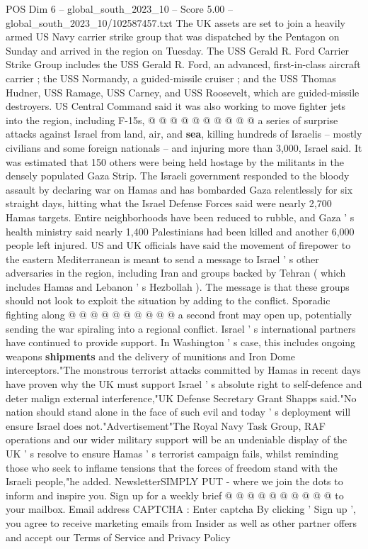 \begin{textsample}{POS Dim 6 – global\_south\_2023\_10 – Score 5.00 – global\_south\_2023\_10/102587457.txt}
The UK assets are set to join a heavily armed US Navy carrier strike group that was dispatched by the Pentagon on Sunday and arrived in the region on Tuesday.
The USS Gerald R.
Ford Carrier Strike Group includes the USS Gerald R.
Ford, an advanced, first-in-class aircraft carrier ; the USS Normandy, a guided-missile cruiser ; and the USS Thomas Hudner, USS Ramage, USS Carney, and USS Roosevelt, which are guided-missile destroyers.
US Central Command said it was also working to move fighter jets into the region, including F-15s, @ @ @ @ @ @ @ @ @ @ a series of surprise attacks against Israel from land, air, and \textbf{sea}, killing hundreds of Israelis -- mostly civilians and some foreign nationals -- and injuring more than 3,000, Israel said.
It was estimated that 150 others were being held hostage by the militants in the densely populated Gaza Strip.
The Israeli government responded to the bloody assault by declaring war on Hamas and has bombarded Gaza relentlessly for six straight days, hitting what the Israel Defense Forces said were nearly 2,700 Hamas targets.
Entire neighborhoods have been reduced to rubble, and Gaza ' s health ministry said nearly 1,400 Palestinians had been killed and another 6,000 people left injured.
US and UK officials have said the movement of firepower to the eastern Mediterranean is meant to send a message to Israel ' s other adversaries in the region, including Iran and groups backed by Tehran ( which includes Hamas and Lebanon ' s Hezbollah ).
The message is that these groups should not look to exploit the situation by adding to the conflict.
Sporadic fighting along @ @ @ @ @ @ @ @ @ @ a second front may open up, potentially sending the war spiraling into a regional conflict.
Israel ' s international partners have continued to provide support.
In Washington ' s case, this includes ongoing weapons \textbf{shipments} and the delivery of munitions and Iron Dome interceptors."The monstrous terrorist attacks committed by Hamas in recent days have proven why the UK must support Israel ' s absolute right to self-defence and deter malign external interference,"UK Defense Secretary Grant Shapps said."No nation should stand alone in the face of such evil and today ' s deployment will ensure Israel does not."Advertisement"The Royal Navy Task Group, RAF operations and our wider military support will be an undeniable display of the UK ' s resolve to ensure Hamas ' s terrorist campaign fails, whilst reminding those who seek to inflame tensions that the forces of freedom stand with the Israeli people,"he added.
NewsletterSIMPLY PUT - where we join the dots to inform and inspire you.
Sign up for a weekly brief @ @ @ @ @ @ @ @ @ @ to your mailbox.
Email address CAPTCHA : Enter captcha By clicking ' Sign up ', you agree to receive marketing emails from Insider as well as other partner offers and accept our Terms of Service and Privacy Policy

\end{textsample}
